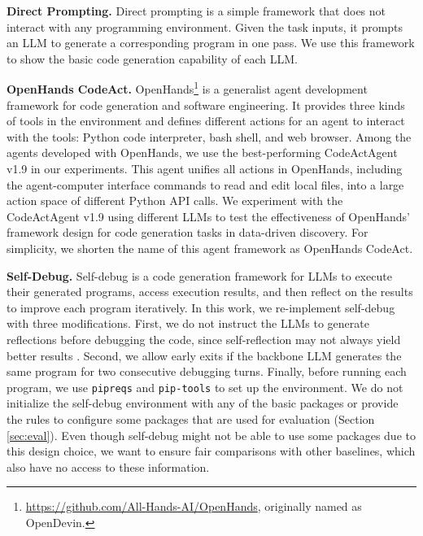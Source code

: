 \documentclass{article} %
\begin{document}
%
\textbf{Direct Prompting.} 
Direct prompting is a simple framework that does not interact with any programming environment.
Given the task inputs, it prompts an LLM to generate a corresponding program in one pass.
We use this framework to show the basic code generation capability of each LLM.
%

%
\textbf{OpenHands CodeAct.}
OpenHands\footnote{\url{https://github.com/All-Hands-AI/OpenHands}, originally named as OpenDevin. } \citep{wang2024opendevinopenplatformai} is a generalist agent development framework for code generation and software engineering.
It provides three kinds of tools in the environment and defines different actions for an agent to interact with the tools: Python code interpreter, bash shell, and web browser. 
Among the agents developed with OpenHands, we use the best-performing CodeActAgent v1.9 \citep{wang2024executable} in our experiments.
This agent unifies all actions in OpenHands, including the agent-computer interface commands \citep{yang2024sweagent} to read and edit local files, into a large action space of different Python API calls.
We experiment with the CodeActAgent v1.9 using different LLMs to test the effectiveness of OpenHands' framework design for code generation tasks in data-driven discovery. 
For simplicity, we shorten the name of this agent framework as OpenHands CodeAct.
%

%
\textbf{Self-Debug.}
Self-debug \citep{chen2024selfdebug} is a code generation framework for LLMs to execute their generated programs, access execution results, and then reflect on the results to improve each program iteratively.
In this work, we re-implement self-debug with three modifications.
First, we do not instruct the LLMs to generate reflections before debugging the code, since self-reflection may not always yield better results \citep{chen-etal-2024-tree, huang2024llm_selfcorrect, jiang2024selfincorrectllmsstrugglediscriminating}. 
Second, we allow early exits if the backbone LLM generates the same program for two consecutive debugging turns.
Finally, before running each program, we use \texttt{pipreqs} and \texttt{pip-tools} to set up the environment.
We do not initialize the self-debug environment with any of the basic packages or provide the rules to configure some packages that are used for evaluation (Section \ref{sec:eval}).
Even though self-debug might not be able to use some packages due to this design choice, we want to ensure fair comparisons with other baselines, which also have no access to these information.
%
\end{document}
